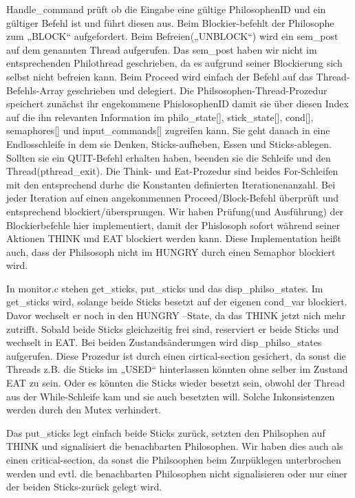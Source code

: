 Handle\-\_\-command prüft ob die Eingabe eine gültige Philosophen\-I\-D und ein gültiger Befehl ist und führt diesen aus. Beim Blockier-\/befehlt der Philosophe zum „\-B\-L\-O\-C\-K“ aufgefordert. Beim Befreien(„\-U\-N\-B\-L\-O\-C\-K“) wird ein sem\-\_\-post auf dem genannten Thread aufgerufen. Das sem\-\_\-post haben wir nicht im entsprechenden Philothread geschrieben, da es aufgrund seiner Blockierung sich selbst nicht befreien kann. Beim Proceed wird einfach der Befehl auf das Thread-\/\-Befehls-\/\-Array geschrieben und delegiert. Die Philsosophen-\/\-Thread-\/\-Prozedur speichert zunächst ihr engekommene Phislosophen\-I\-D damit sie über diesen Index auf die ihn relevanten Information im philo\-\_\-state\mbox{[}\mbox{]}, stick\-\_\-state\mbox{[}\mbox{]}, cond\mbox{[}\mbox{]}, semaphores\mbox{[}\mbox{]} und input\-\_\-commands\mbox{[}\mbox{]} zugreifen kann. Sie geht danach in eine Endlosschleife in dem sie Denken, Sticks-\/aufheben, Essen und Sticks-\/ablegen. Sollten sie ein Q\-U\-I\-T-\/\-Befehl erhalten haben, beenden sie die Schleife und den Thread(pthread\-\_\-exit). Die Think-\/ und Eat-\/\-Prozedur sind beides For-\/\-Schleifen mit den entsprechend durhc die Konstanten definierten Iterationenanzahl. Bei jeder Iteration auf einen angekommennen Proceed/\-Block-\/\-Befehl überprüft und entsprechend blockiert/übersprungen. Wir haben Prüfung(und Ausführung) der Blockierbefehle hier implementiert, damit der Phislosoph sofort während seiner Aktionen T\-H\-I\-N\-K und E\-A\-T blockiert werden kann. Diese Implementation heißt auch, dass der Philsosoph nicht im H\-U\-N\-G\-R\-Y durch einen Semaphor blockiert wird.

In monitor.\-c stehen get\-\_\-sticks, put\-\_\-sticks und das disp\-\_\-philso\-\_\-states. Im get\-\_\-sticks wird, solange beide Sticks besetzt auf der eigenen cond\-\_\-var blockiert. Davor wechselt er noch in den H\-U\-N\-G\-R\-Y –\-State, da das T\-H\-I\-N\-K jetzt nich mehr zutrifft. Sobald beide Sticks gleichzeitig frei sind, reserviert er beide Sticks und wechselt in E\-A\-T. Bei beiden Zustandsänderungen wird disp\-\_\-philso\-\_\-states aufgerufen. Diese Prozedur ist durch einen cirtical-\/section gesichert, da sonst die Threads z.\-B. die Sticks im „\-U\-S\-E\-D“ hinterlassen könnten ohne selber im Zustand E\-A\-T zu sein. Oder es könnten die Sticks wieder besetzt sein, obwohl der Thread aus der While-\/\-Schleife kam und sie auch besetzten will. Solche Inkonsistenzen werden durch den Mutex verhindert.

Das put\-\_\-sticks legt einfach beide Sticks zurück, setzten den Philsophen auf T\-H\-I\-N\-K und signalisiert die benachbarten Philosophen. Wir haben dies auch als einen critical-\/section, da sonst die Philsoophen beim Zurpüklegen unterbrochen werden und evtl. die benachbarten Philosophen nicht signalisieren oder nur einer der beiden Sticks-\/zurück gelegt wird.

